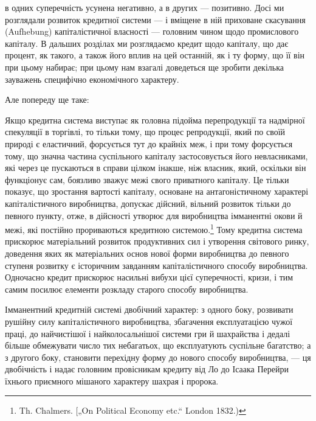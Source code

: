 в одних суперечність усунена негативно, а в других — позитивно.
Досі ми розглядали розвиток кредитної системи — і вміщене
в ній приховане скасування (Aufhebung) капіталістичної власності — головним чином щодо промислового
капіталу. В дальших розділах ми розглядаємо кредит щодо капіталу, що дає процент, як
такого, а також його вплив на цей останній, як і ту форму, що
її він при цьому набирає; при цьому нам взагалі доведеться ще
зробити декілька зауважень специфічно економічного характеру.

Але попереду ще таке:

Якщо кредитна система виступає як головна підойма перепродукції та надмірної спекуляції в торгівлі,
то тільки тому,
що процес репродукції, який по своїй природі є еластичний,
форсується тут до крайніх меж, і при тому форсується тому,
що значна частина суспільного капіталу застосовується його
невласниками, які через це пускаються в справи цілком інакше,
ніж власник, який, оскільки він функціонує сам, боязливо зважує
межі свого приватного капіталу. Це тільки показує, що зростання вартості капіталу, основане на
антагоністичному характері
капіталістичного виробництва, допускає дійсний, вільний розвиток тільки до певного пункту, отже, в
дійсності утворює для виробництва імманентні окови й межі, які постійно прориваються
кредитною системою.\footnote{
Th. Chalmers. [„On Political Economy etc.“ London 1832.)
} Тому кредитна система прискорює матеріальний розвиток продуктивних сил і
утворення світового ринку,
доведення яких як матеріальних основ нової форми виробництва
до певного ступеня розвитку є історичним завданням капіталістичного способу виробництва. Одночасно
кредит прискорює насильні вибухи цієї суперечності, кризи, і тим самим посилює елементи розкладу
старого способу виробництва.

Імманентний кредитній системі двобічний характер: з одного
боку, розвивати рушійну силу капіталістичного виробництва,
збагачення експлуатацією чужої праці, до найчистішої і найколосальнішої системи гри й шахрайства і
дедалі більше обмежувати число тих небагатьох, що експлуатують суспільне багатство; а з другого
боку, становити перехідну форму до нового
способу виробництва, — ця двобічність і надає головним провісникам кредиту від Ло до Ісаака Перейри
їхнього приємного мішаного характеру шахрая і пророка.